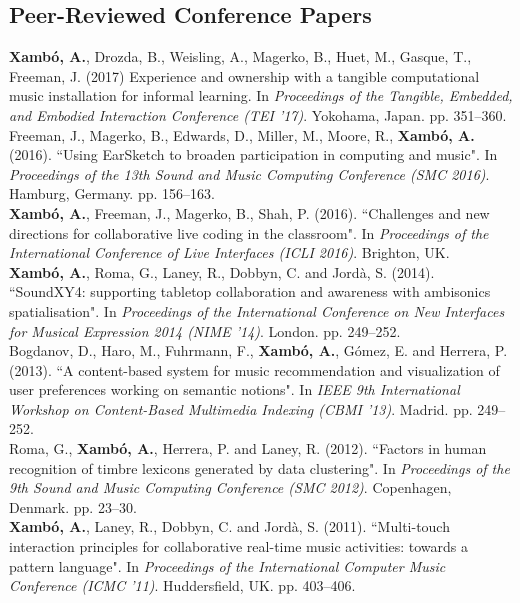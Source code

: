 \documentclass[10pt, a4paper]{article}
\newcommand{\years}[1]{\marginnote{\scriptsize #1}}
\begin{document}
\subsection*{Peer-Reviewed Conference Papers}
\noindent
\years{2017}\textbf{Xambó, A.}, Drozda, B., Weisling, A., Magerko, B., Huet, M., Gasque, T., Freeman, J. (2017) Experience and ownership with a tangible computational music installation for informal learning. In \emph{Proceedings of the Tangible, Embedded, and Embodied Interaction Conference (TEI '17)}. Yokohama, Japan. pp. 351--360.\\ 
\years{2016b}Freeman, J., Magerko, B., Edwards, D., Miller, M., Moore, R., \textbf{Xambó, A.} (2016). “Using EarSketch to broaden participation in computing and music". In \emph{Proceedings of the 13th Sound and Music Computing Conference (SMC 2016)}. Hamburg, Germany. pp. 156--163.\\
\years{2016a}\textbf{Xambó, A.}, Freeman, J., Magerko, B., Shah, P. (2016). “Challenges and new directions for collaborative live coding in the classroom". In \emph{Proceedings of the International Conference of Live Interfaces (ICLI 2016)}. Brighton, UK.\\
\years{2014}\textbf{Xambó, A.}, Roma, G., Laney, R., Dobbyn, C. and Jordà, S. (2014). “SoundXY4: supporting tabletop collaboration and awareness with ambisonics spatialisation". In \emph{Proceedings of the International Conference on New Interfaces for Musical Expression 2014 (NIME '14)}. London. pp. 249--252.\\
\years{2013}Bogdanov, D., Haro, M., Fuhrmann, F., \textbf{Xambó, A.}, Gómez, E. and Herrera, P. (2013). “A content-based system for music recommendation and visualization of user preferences working on semantic notions". In \emph{IEEE 9th International Workshop on Content-Based Multimedia Indexing (CBMI '13)}. Madrid. pp. 249--252.\\
\years{2012}Roma, G., \textbf{Xambó, A.}, Herrera, P. and Laney, R. (2012). “Factors in human recognition of timbre lexicons generated by data clustering". In \emph{Proceedings of the 9th Sound and Music Computing Conference (SMC 2012)}. Copenhagen, Denmark. pp. 23--30.\\
\years{2011c}\textbf{Xambó, A.}, Laney, R., Dobbyn, C. and Jordà, S. (2011). “Multi-touch interaction principles for collaborative real-time music activities: towards a pattern language". In \emph{Proceedings of the International Computer Music Conference (ICMC '11)}. Huddersfield, UK. pp. 403--406.\\
\end{document}
